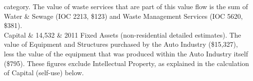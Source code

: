 \begin{longtabu}
											category.
											The value of waste services that are part 
											of this value flow 
											is the sum of Water \& Sewage (IOC 2213, \$123) 
											and Waste Management Services (IOC 5620, \$381).    \\
Capital             &  14,532      	&   	2011  Fixed Assets (non-residential detailed estimates).
											The  value of Equipment
											and Structures purchased by the Auto Industry (\$15,327), 
											less the value of the equipment 
											that was produced within 
											the Auto Industry itself (\$795). 
											These figures exclude Intellectual Property, 
											as explained in
											the calculation of Capital (self-use) below.     	\\  
 

\end{longtabu}
